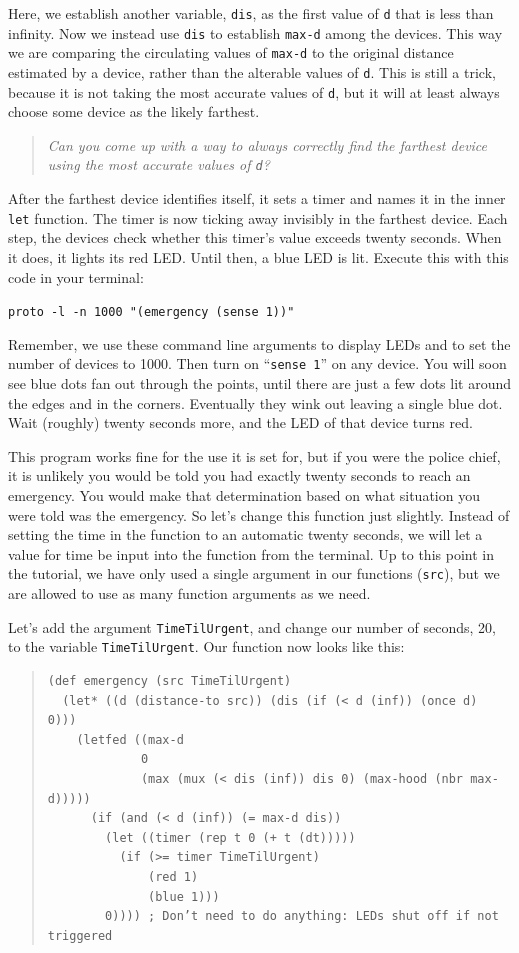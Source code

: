 \documentclass{article}
\newcommand\code[1]{\begin{center}\var{#1}\end{center}}
\newcommand\problem[1]{\begin{quote}{\em #1}\end{quote}}
\newcommand\var[1]{{\tt #1}}
\newcommand\qvar[1]{``{\tt #1}''}
\begin{document}
Here, we establish another variable, \var{dis}, as the first value of
\var{d} that is less than infinity.  Now we instead use \var{dis} to
establish \var{max-d} among the devices.  This way we are comparing
the circulating values of \var{max-d} to the original distance
estimated by a device, rather than the alterable values of \var{d}.
This is still a trick, because it is not taking the most accurate
values of \var{d}, but it will at least always choose some device as
the likely farthest.

\problem{Can you come up with a way to always correctly find the
  farthest device using the most accurate values of \var{d}?}

After the farthest device identifies itself, it sets a timer and names
it in the inner \var{let} function.  The timer is now ticking away
invisibly in the farthest device.  Each step, the devices check
whether this timer's value exceeds twenty seconds.  When it does, it
lights its red LED.  Until then, a blue LED is lit. Execute this with
this code in your terminal:

\code{proto -l -n 1000 "(emergency (sense 1))"}

Remember, we use these command line arguments to display LEDs and to
set the number of devices to 1000.  Then turn on \qvar{sense 1} on any
device.  You will soon see blue dots fan out through the points, until
there are just a few dots lit around the edges and in the corners.
Eventually they wink out leaving a single blue dot.  Wait (roughly)
twenty seconds more, and the LED of that device turns red.

This program works fine for the use it is set for, but if you were the
police chief, it is unlikely you would be told you had exactly twenty
seconds to reach an emergency.  You would make that determination
based on what situation you were told was the emergency.  So let's
change this function just slightly.  Instead of setting the time in
the function to an automatic twenty seconds, we will let a value for
time be input into the function from the terminal.  Up to this point
in the tutorial, we have only used a single argument in our functions
(\var{src}), but we are allowed to use as many function arguments as we need.

Let's add the argument \var{TimeTilUrgent}, and change our number of
seconds, 20, to the variable \var{TimeTilUrgent}.  Our function now
looks like this:

\begin{quote}
\begin{verbatim}
(def emergency (src TimeTilUrgent)
  (let* ((d (distance-to src)) (dis (if (< d (inf)) (once d) 0))) 
    (letfed ((max-d 
             0 
             (max (mux (< dis (inf)) dis 0) (max-hood (nbr max-d)))))
      (if (and (< d (inf)) (= max-d dis))
        (let ((timer (rep t 0 (+ t (dt)))))
          (if (>= timer TimeTilUrgent)
              (red 1) 
              (blue 1)))
        0)))) ; Don’t need to do anything: LEDs shut off if not triggered
\end{verbatim}
\end{quote}
\end{document}
